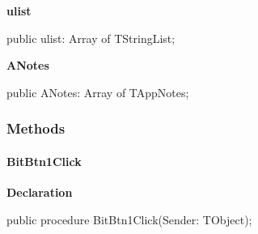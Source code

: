 \documentclass{report}
\newif\ifpdf
\begin{document}
\begin{list}{}
\par  \label{mnupdate.TUMnForm-ulist}
\item[\textbf{ulist}\hfill]
\ifpdf
\begin{flushleft}
\fi
\begin{ttfamily}
public ulist: Array of TStringList;\end{ttfamily}

\ifpdf
\end{flushleft}
\fi


\par  \label{mnupdate.TUMnForm-ANotes}
\item[\textbf{ANotes}\hfill]
\ifpdf
\begin{flushleft}
\fi
\begin{ttfamily}
public ANotes: Array of TAppNotes;\end{ttfamily}

\ifpdf
\end{flushleft}
\fi


\par  \end{list}
\subsubsection*{\large{\textbf{Methods}}\normalsize\hspace{1ex}\hfill}
\paragraph*{BitBtn1Click}\hspace*{\fill}

\label{mnupdate.TUMnForm-BitBtn1Click}
\begin{list}{}{
\setlength{\itemindent}{0cm}
\setlength{\listparindent}{0cm}
\setlength{\leftmargin}{\evensidemargin}
\addtolength{\leftmargin}{\tmplength}
\settowidth{\labelsep}{X}
\addtolength{\leftmargin}{\labelsep}
\setlength{\labelwidth}{\tmplength}
}
\item[\textbf{Declaration}\hfill]
\ifpdf
\begin{flushleft}
\fi
\begin{ttfamily}
public procedure BitBtn1Click(Sender: TObject);\end{ttfamily}

\ifpdf
\end{flushleft}
\fi

\end{list}
\end{document}
